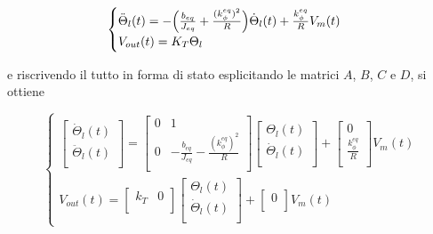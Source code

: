 \documentclass[english]{article}
\begin{document}
		\begin{equation}
			\begin{cases}
				\ddot{\Theta}_l(t)=-\Bigl(\frac{b_{eq}}{J_{eq}}+\frac{(k_{\phi}^{eq})^2}{R}\Bigl)\dot{\Theta}_l(t)+\frac{k_{\phi}^{eq}}{R}V_m(t) \\
				V_{out}(t)=K_T\Theta_l
			\end{cases}
		\end{equation}
		
		\noindent e riscrivendo il tutto in forma di stato esplicitando le matrici $A$, $B$, $C$ e $D$, si ottiene
		
		\begin{equation}
			\begin{cases}
				\begin{bmatrix}
					\dot{\Theta}_l(t)  \\
					\ddot{\Theta}_l(t) \\
				\end{bmatrix}
				=
				\begin{bmatrix}
					0 & 1                                  \\
					0 & -\frac{b_{eq}}{J_{eq}}-\frac{(k_{\phi}^{eq})^2}{R} \\
				\end{bmatrix}
				\begin{bmatrix}
					\Theta_l(t)       \\
					\dot{\Theta}_l(t) \\
				\end{bmatrix}	
				+
				\begin{bmatrix}
					0                       \\
					\frac{k_{\phi}^{eq}}{R} \\
				\end{bmatrix}
				V_m(t) \\
				V_{out}(t)=
				\begin{bmatrix}
					k_T & 0 \\
				\end{bmatrix}
				\begin{bmatrix}
					\Theta_l(t)       \\
					\dot{\Theta}_l(t) \\
				\end{bmatrix}
				+
				\begin{bmatrix}
					0 \\
				\end{bmatrix}
				V_m(t)											
			\end{cases}
		\end{equation}
		
\end{document}
